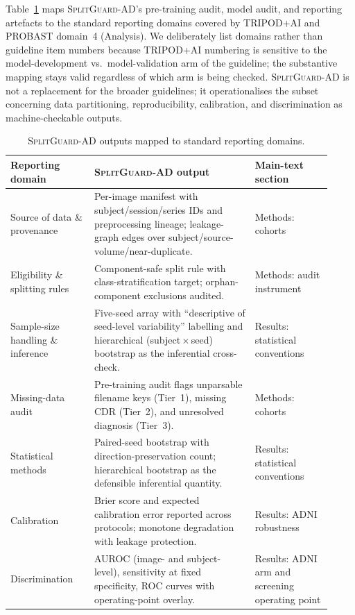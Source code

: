 \documentclass[11pt]{article}
\newcommand{\SGA}{\textsc{SplitGuard-AD}}
\begin{document}
Table~\ref{tab:sm_tripod_map} maps \SGA{}'s pre-training audit, model
audit, and reporting artefacts to the standard reporting domains
covered by TRIPOD+AI and PROBAST domain~4 (Analysis). We deliberately
list domains rather than guideline item numbers because TRIPOD+AI
numbering is sensitive to the model-development vs.\ model-validation
arm of the guideline; the substantive mapping stays valid regardless
of which arm is being checked. \SGA{} is not a replacement for the
broader guidelines; it operationalises the subset concerning data
partitioning, reproducibility, calibration, and discrimination as
machine-checkable outputs.

\begin{table}[!ht]
\centering
\small
\caption{\SGA{} outputs mapped to standard reporting domains.}
\label{tab:sm_tripod_map}
\begin{tabular}{p{0.24\linewidth}p{0.46\linewidth}p{0.22\linewidth}}
\toprule
\textbf{Reporting domain} & \textbf{\SGA{} output} & \textbf{Main-text section} \\
\midrule
Source of data \& provenance & Per-image manifest with subject/session/series IDs and preprocessing lineage; leakage-graph edges over subject/source-volume/near-duplicate. & Methods: cohorts \\
Eligibility \& splitting rules & Component-safe split rule with class-stratification target; orphan-component exclusions audited. & Methods: audit instrument \\
Sample-size handling \& inference & Five-seed array with ``descriptive of seed-level variability'' labelling and hierarchical (subject\,$\times$\,seed) bootstrap as the inferential cross-check. & Results: statistical conventions \\
Missing-data audit & Pre-training audit flags unparsable filename keys (Tier~1), missing CDR (Tier~2), and unresolved diagnosis (Tier~3). & Methods: cohorts \\
Statistical methods & Paired-seed bootstrap with direction-preservation count; hierarchical bootstrap as the defensible inferential quantity. & Results: statistical conventions \\
Calibration & Brier score and expected calibration error reported across protocols; monotone degradation with leakage protection. & Results: ADNI robustness \\
Discrimination & AUROC (image- and subject-level), sensitivity at fixed specificity, ROC curves with operating-point overlay. & Results: ADNI arm and screening operating point \\

\end{tabular}
\end{table}
\end{document}
